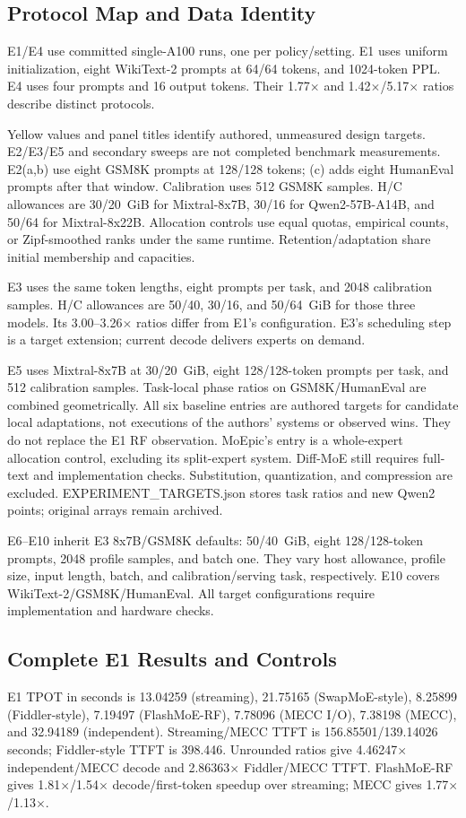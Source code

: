 \documentclass[conference,9pt,letterpaper]{IEEEtran}
\begin{document}
\subsection{Protocol Map and Data Identity}
E1/E4 use committed single-A100 runs, one per policy/setting. E1 uses uniform initialization, eight WikiText-2 prompts at 64/64 tokens, and 1024-token PPL. E4 uses four prompts and 16 output tokens. Their 1.77$\times$ and 1.42$\times$/5.17$\times$ ratios describe distinct protocols.

Yellow values and panel titles identify authored, unmeasured design targets. E2/E3/E5 and secondary sweeps are not completed benchmark measurements. E2(a,b) use eight GSM8K prompts at 128/128 tokens; (c) adds eight HumanEval prompts after that window. Calibration uses 512 GSM8K samples. H/C allowances are 30/20~GiB for Mixtral-8x7B, 30/16 for Qwen2-57B-A14B, and 50/64 for Mixtral-8x22B. Allocation controls use equal quotas, empirical counts, or Zipf-smoothed ranks under the same runtime. Retention/adaptation share initial membership and capacities.

E3 uses the same token lengths, eight prompts per task, and 2048 calibration samples. H/C allowances are 50/40, 30/16, and 50/64~GiB for those three models. Its 3.00--3.26$\times$ ratios differ from E1's configuration. E3's scheduling step is a target extension; current decode delivers experts on demand.

E5 uses Mixtral-8x7B at 30/20~GiB, eight 128/128-token prompts per task, and 512 calibration samples. Task-local phase ratios on GSM8K/HumanEval are combined geometrically. All six baseline entries are authored targets for candidate local adaptations, not executions of the authors' systems or observed wins. They do not replace the E1 RF observation. MoEpic's entry is a whole-expert allocation control, excluding its split-expert system. Diff-MoE still requires full-text and implementation checks. Substitution, quantization, and compression are excluded. EXPERIMENT\_TARGETS.json stores task ratios and new Qwen2 points; original arrays remain archived.

E6--E10 inherit E3 8x7B/GSM8K defaults: 50/40~GiB, eight 128/128-token prompts, 2048 profile samples, and batch one. They vary host allowance, profile size, input length, batch, and calibration/serving task, respectively. E10 covers WikiText-2/GSM8K/HumanEval. All target configurations require implementation and hardware checks.

\subsection{Complete E1 Results and Controls}
E1 TPOT in seconds is 13.04259 (streaming), 21.75165 (SwapMoE-style), 8.25899 (Fiddler-style), 7.19497 (FlashMoE-RF), 7.78096 (MECC I/O), 7.38198 (MECC), and 32.94189 (independent). Streaming/MECC TTFT is 156.85501/139.14026 seconds; Fiddler-style TTFT is 398.446. Unrounded ratios give 4.46247$\times$ independent/MECC decode and 2.86363$\times$ Fiddler/MECC TTFT. FlashMoE-RF gives 1.81$\times$/1.54$\times$ decode/first-token speedup over streaming; MECC gives 1.77$\times$/1.13$\times$.
\end{document}
